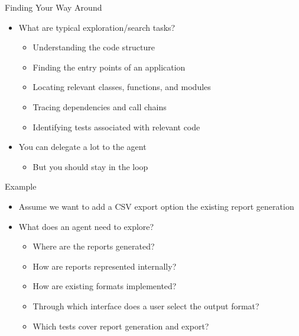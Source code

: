\documentclass[
ps,
]{prosper}
\begin{document}
\begin{slide}{Finding Your Way Around}

\begin{itemize}

\item What are typical exploration/search tasks?

  \begin{itemize}
    
  \item Understanding the code structure

  \item Finding the entry points of an application

  \item Locating relevant classes, functions, and modules

  \item Tracing dependencies and call chains

  \item Identifying tests associated with relevant code
    
  \end{itemize}

\item You can delegate a lot to the agent

  \begin{itemize}
    
  \item But you should stay in the loop
    
  \end{itemize}

\end{itemize}
  
\end{slide}


\begin{slide}{Example}

\begin{itemize}

\item Assume we want to add a CSV export option the existing report generation

\item What does an agent need to explore?

  \begin{itemize}
    
  \item Where are the reports generated?

  \item How are reports represented internally?

  \item How are existing formats implemented?

  \item Through which interface does a user select the output format?

  \item Which tests cover report generation and export?
    
  \end{itemize}

\end{itemize}
  
\end{slide}
\end{document}
